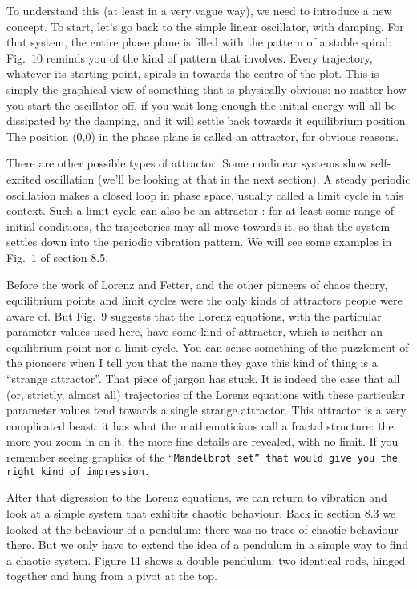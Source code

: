   To understand this (at least in a very vague way), we need to introduce a new 
  concept. To start, let’s go back to the simple linear oscillator, with 
  damping. For that system, the entire phase plane is filled with the pattern 
  of a stable spiral: Fig.\ 10 reminds you of the kind of pattern that 
  involves. Every trajectory, whatever its starting point, spirals in towards 
  the centre of the plot. This is simply the graphical view of something that 
  is physically obvious: no matter how you start the oscillator off, if you 
  wait long enough the initial energy will all be dissipated by the damping, 
  and it will settle back towards it equilibrium position. The position (0,0) 
  in the phase plane is called an attractor, for obvious reasons. 

  There are other possible types of attractor. Some nonlinear systems show 
  self-excited oscillation (we’ll be looking at that in the next section). A 
  steady periodic oscillation makes a closed loop in phase space, usually 
  called a limit cycle in this context. Such a limit cycle can also be an 
  attractor : for at least some range of initial conditions, the trajectories 
  may all move towards it, so that the system settles down into the periodic 
  vibration pattern. We will see some examples in Fig.\ 1 of section 8.5. 

  Before the work of Lorenz and Fetter, and the other pioneers of chaos theory, 
  equilibrium points and limit cycles were the only kinds of attractors people 
  were aware of. But Fig.\ 9 suggests that the Lorenz equations, with the 
  particular parameter values used here, have some kind of attractor, which is 
  neither an equilibrium point nor a limit cycle. You can sense something of 
  the puzzlement of the pioneers when I tell you that the name they gave this 
  kind of thing is a “strange attractor”. That piece of jargon has stuck. It is 
  indeed the case that all (or, strictly, almost all) trajectories of the 
  Lorenz equations with these particular parameter values tend towards a single 
  strange attractor. This attractor is a very complicated beast: it has what 
  the mathematicians call a fractal structure: the more you zoom in on it, the 
  more fine details are revealed, with no limit. If you remember seeing 
  graphics of the “\tt{}Mandelbrot set\rm{}” that would give you the right kind 
  of impression. 

  After that digression to the Lorenz equations, we can return to vibration and 
  look at a simple system that exhibits chaotic behaviour. Back in section 8.3 
  we looked at the behaviour of a pendulum: there was no trace of chaotic 
  behaviour there. But we only have to extend the idea of a pendulum in a 
  simple way to find a chaotic system. Figure 11 shows a double pendulum: two 
  identical rods, hinged together and hung from a pivot at the top. 

